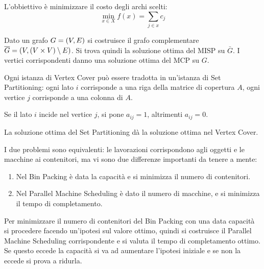 \documentclass[\main/main.tex]{subfiles}
\begin{document}
\begin{multicols}{2}
\begin{definition}
\begin{enumerate}
        \end{enumerate}
    \end{definition}
    \begin{definition}
        L'obbiettivo è minimizzare il costo degli archi scelti:
        \[
            \min_{x \in X} f(x) = \sum_{j \in x} c_j
        \]
    \end{definition}
    \begin{observation}
        Dato un grafo \(G = \left(V, E\right)\) si costruisce il grafo complementare \(\overline{G} = \left(V, \left(V \times V\right) \setminus E\right)\). Si trova quindi la soluzione ottima del MISP su \(\bar{G}\). I vertici corrispondenti danno una soluzione ottima del MCP su \(G\).
    \end{observation}
    \begin{observation}
        Ogni istanza di Vertex Cover può essere tradotta in un'istanza di Set Partitioning: ogni lato \(i\) corrisponde a una riga della matrice di copertura \(A\), ogni vertice \(j\) corrisponde a una colonna di \(A\).
        
        Se il lato \(i\) incide nel vertice \(j\), si pone \(a_{ij} = 1\), altrimenti \(a_{ij}=0\). 
        
        La soluzione ottima del Set Partitioning dà la soluzione ottima nel Vertex Cover.
    \end{observation}
    \begin{observation}
        I due problemi sono equivalenti: le lavorazioni corrispondono agli oggetti e le macchine ai contenitori, ma vi sono due differenze importanti da tenere a mente:
        \begin{enumerate}
            \item Nel Bin Packing è data la capacità e si minimizza il numero di contenitori.
            \item Nel Parallel Machine Scheduling è dato il numero di macchine, e si minimizza il tempo di completamento.
        \end{enumerate}
        Per minimizzare il numero di contenitori del Bin Packing con una data capacità si procedere facendo un'ipotesi sul valore ottimo, quindi si costruisce il Parallel Machine Scheduling corrispondente e si valuta il tempo di completamento ottimo. Se questo eccede la capacità si va ad aumentare l'ipotesi iniziale e se non la eccede si prova a ridurla.
    \end{observation}
\end{multicols}
\end{document}
